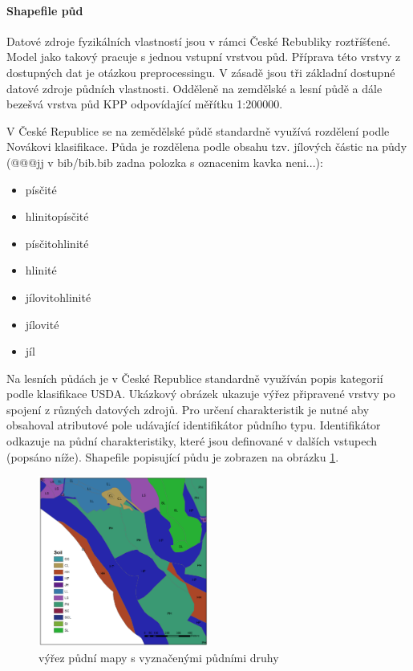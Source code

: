  
\paragraph{Shapefile půd} \label{sec:vstuppuda}

Datové zdroje fyzikálních vlastností jsou v rámci České Rebubliky roztříšťené. Model jako takový pracuje s jednou vstupní vrstvou půd. Příprava této vrstvy z dostupných dat je otázkou preprocessingu. V zásadě jsou tři základní dostupné datové zdroje půdních vlastnosti. Odděleně na zemdělské a lesní půdě a dále bezešvá vrstva půd KPP odpovídající měřítku 1:200000.

V České Republice se na zemědělské půdě standardně využívá rozdělení podle Novákovi klasifikace. Půda je rozdělena podle obsahu tzv. jílových částic na půdy \cite{kavka} (@@@jj v bib/bib.bib zadna polozka s oznacenim kavka neni...):
\begin{itemize} \itemsep 0pt
  \item písčité
  \item hlinitopísčité
  \item písčitohlinité
  \item hlinité
  \item jílovitohlinité
  \item jílovité
  \item jíl
\end{itemize}

Na lesních půdách je v České Republice standardně využíván popis kategorií podle klasifikace USDA.
Ukázkový obrázek ukazuje výřez připravené vrstvy po spojení z různých datových zdrojů. Pro určení charakteristik je nutné aby obsahoval atributové pole udávající identifikátor půdního typu. Identifikátor odkazuje na půdní charakteristiky, které jsou definované v dalších vstupech (popsáno níže). Shapefile popisující půdu je zobrazen na obrázku \ref{fig:bykovicepuda}.


\begin{figure}
  \centering
  \includegraphics[width=0.5\textwidth]{./img/pudy.png}
  \caption{výřez půdní mapy s vyznačenými půdními druhy}
  \label{fig:bykovicepuda}
\end{figure}


